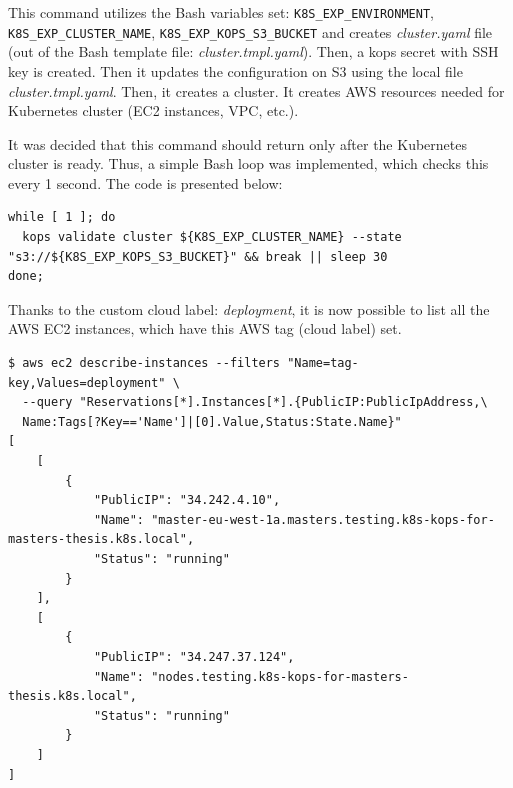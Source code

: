 This command utilizes the Bash variables set: \verb|K8S_EXP_ENVIRONMENT|, \verb|K8S_EXP_CLUSTER_NAME|, \verb|K8S_EXP_KOPS_S3_BUCKET| and creates \textit{cluster.yaml} file (out of the Bash template file: \textit{cluster.tmpl.yaml}). Then, a kops secret with SSH key is created. Then it updates the configuration on S3 using the local file \textit{cluster.tmpl.yaml}. Then, it creates a cluster. It creates AWS resources needed for Kubernetes cluster (EC2 instances, VPC, etc.).

It was decided that this command should return only after the Kubernetes cluster is ready. Thus, a simple Bash loop was implemented, which checks this every 1 second. The code is presented below:
\begin{lstlisting}[basicstyle=\tiny,caption={A waiting mechanism that waits until a kops cluster is ready}]
while [ 1 ]; do
  kops validate cluster ${K8S_EXP_CLUSTER_NAME} --state "s3://${K8S_EXP_KOPS_S3_BUCKET}" && break || sleep 30
done;
\end{lstlisting}

Thanks to the custom cloud label: \textit{deployment}, it is now possible to list all the AWS EC2 instances, which have this AWS tag (cloud label) set.
\begin{lstlisting}[basicstyle=\tiny,caption={Listing all AWS EC2 instances by AWS tag}]
$ aws ec2 describe-instances --filters "Name=tag-key,Values=deployment" \
  --query "Reservations[*].Instances[*].{PublicIP:PublicIpAddress,\
  Name:Tags[?Key=='Name']|[0].Value,Status:State.Name}"
[
    [
        {
            "PublicIP": "34.242.4.10",
            "Name": "master-eu-west-1a.masters.testing.k8s-kops-for-masters-thesis.k8s.local",
            "Status": "running"
        }
    ],
    [
        {
            "PublicIP": "34.247.37.124",
            "Name": "nodes.testing.k8s-kops-for-masters-thesis.k8s.local",
            "Status": "running"
        }
    ]
]
\end{lstlisting}



